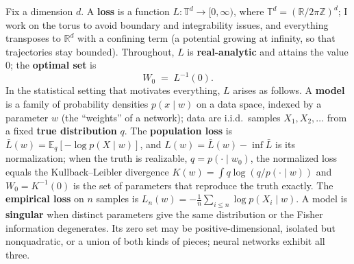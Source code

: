 \documentclass[11pt]{amsart}
\theoremstyle{plain}
\theoremstyle{definition}
\newcommand{\R}{\mathbb{R}}
\newcommand{\E}{\mathbb{E}}
\newcommand{\T}{\mathbb{T}}
\begin{document}
Fix a dimension $d$. A \textbf{loss} is a function $L\colon \T^d \to [0,\infty)$, where $\T^d = (\R/2\pi\mathbb{Z})^d$; I work on the torus to avoid boundary and integrability issues, and everything transposes to $\R^d$ with a confining term (a potential growing at infinity, so that trajectories stay bounded). Throughout, $L$ is \textbf{real-analytic} and attains the value $0$; the \textbf{optimal set} is
\[
   W_0 \;=\; L^{-1}(0).
\]
In the statistical setting that motivates everything, $L$ arises as follows. A \textbf{model} is a family of probability densities $p(x \mid w)$ on a data space, indexed by a parameter $w$ (the ``weights'' of a network); data are i.i.d.\ samples $X_1, X_2, \dots$ from a fixed \textbf{true distribution} $q$. The \textbf{population loss} is $\bar L(w) = \E_q[-\log p(X \mid w)]$, and $L(w) = \bar L(w) - \inf \bar L$ is its normalization; when the truth is realizable, $q = p(\cdot \mid w_0)$, the normalized loss equals the Kullback--Leibler divergence $K(w) = \int q \log (q / p(\cdot \mid w))$ and $W_0 = K^{-1}(0)$ is the set of parameters that reproduce the truth exactly. The \textbf{empirical loss} on $n$ samples is $L_n(w) = -\tfrac1n \sum_{i \le n} \log p(X_i \mid w)$. A model is \textbf{singular} when distinct parameters give the same distribution or the Fisher information degenerates. Its zero set may be positive-dimensional, isolated but nonquadratic, or a union of both kinds of pieces; neural networks exhibit all three.
\end{document}
